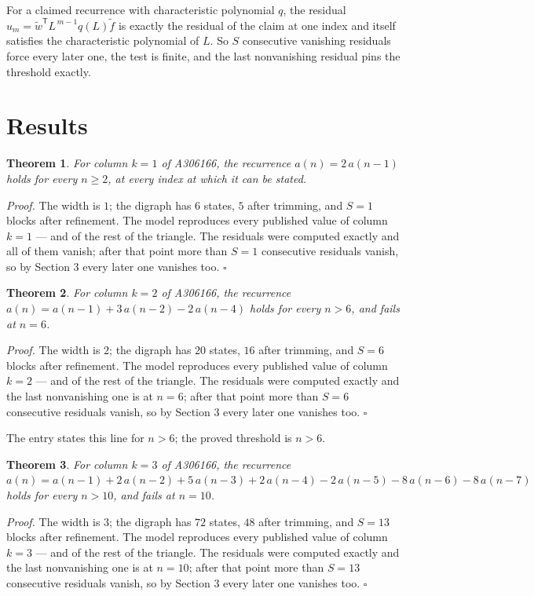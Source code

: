 \documentclass[11pt]{article}
\newtheorem{theorem}{Theorem}
\theoremstyle{definition}
\begin{document}
For a claimed recurrence with characteristic polynomial $q$, the residual $u_m = \tilde w^{\mathsf T}L^{\,m-1}q(L)\tilde f$ is exactly the residual of the claim at one index and itself satisfies the characteristic polynomial of $L$. So $S$ consecutive vanishing residuals force every later one, the test is finite, and the last nonvanishing residual pins the threshold exactly.

\section{Results}

\begin{theorem} For column $k = 1$ of A306166, the recurrence $a(n) = 2\,a(n-1)$ holds for every $n \ge 2$, at every index at which it can be stated.\end{theorem}

{\itshape Proof.} The width is $1$; the digraph has $6$ states, $5$ after trimming, and $S = 1$ blocks after refinement. The model reproduces every published value of column $k = 1$ --- and of the rest of the triangle. The residuals were computed exactly and all of them vanish; after that point more than $S = 1$ consecutive residuals vanish, so by Section 3 every later one vanishes too. $\square$

\begin{theorem} For column $k = 2$ of A306166, the recurrence $a(n) = a(n-1) + 3\,a(n-2) - 2\,a(n-4)$ holds for every $n > 6$, and fails at $n = 6$.\end{theorem}

{\itshape Proof.} The width is $2$; the digraph has $20$ states, $16$ after trimming, and $S = 6$ blocks after refinement. The model reproduces every published value of column $k = 2$ --- and of the rest of the triangle. The residuals were computed exactly and the last nonvanishing one is at $n = 6$; after that point more than $S = 6$ consecutive residuals vanish, so by Section 3 every later one vanishes too. $\square$

The entry states this line for $n > 6$; the proved threshold is $n > 6$.

\begin{theorem} For column $k = 3$ of A306166, the recurrence $a(n) = a(n-1) + 2\,a(n-2) + 5\,a(n-3) + 2\,a(n-4) - 2\,a(n-5) - 8\,a(n-6) - 8\,a(n-7)$ holds for every $n > 10$, and fails at $n = 10$.\end{theorem}

{\itshape Proof.} The width is $3$; the digraph has $72$ states, $48$ after trimming, and $S = 13$ blocks after refinement. The model reproduces every published value of column $k = 3$ --- and of the rest of the triangle. The residuals were computed exactly and the last nonvanishing one is at $n = 10$; after that point more than $S = 13$ consecutive residuals vanish, so by Section 3 every later one vanishes too. $\square$
\end{document}
